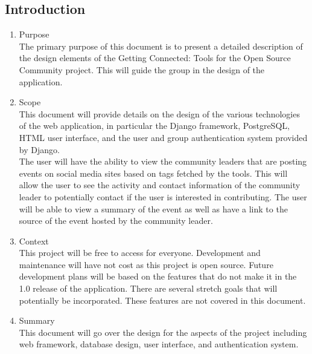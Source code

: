 \documentclass[draftclsnofoot,10pt,onecolumn]{IEEEtran} %
\begin{document}
\subsection{Introduction}
	\begin{enumerate}
	
		\item Purpose \\
		The primary purpose of this document is to present a detailed description of the design elements of the Getting
		Connected: Tools for the Open Source Community project. This will guide the group in the design of the
		application.\\
		
		\item Scope \\
		This document will provide details on the design of the various technologies of the web application, in particular the
		Django framework, PostgreSQL, HTML user interface, and the user and group authentication system provided by Django.\\

		The user will have the ability to view the community leaders that are posting events on social media sites based on
		tags fetched by the tools. This will allow the user to see the activity and contact information of the community leader
		to potentially contact if the user is interested in contributing. The user will be able to view a summary of the event as
		well as have a link to the source of the event hosted by the community leader.\\
		
		\item Context \\
		This project will be free to access for everyone. Development and maintenance will have not cost as this project is
		open source. Future development plans will be based on the features that do not make it in the 1.0 release of the
		application. There are several stretch goals that will potentially be incorporated. These features are not covered in
		this document.\\
		
		\item Summary \\
		This document will go over the design for the aspects of the project including web framework, database design, user
		interface, and authentication system.
	\end{enumerate}
\end{document}
